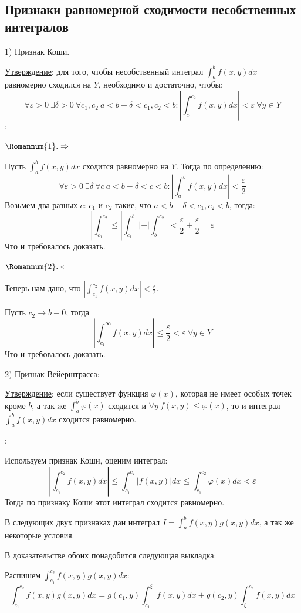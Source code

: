 \documentclass[12pt]{article}
\begin{document}
\subsection{Признаки равномерной сходимости несобственных интегралов}
1) Признак Коши.\par
\uline{Утверждение}: для того, чтобы несобственный интеграл $\int_a^b f(x,y) dx$ равномерно сходился на $Y$, необходимо и достаточно, чтобы:
$$\forall \varepsilon > 0 \ \exists \delta > 0 \ \forall c_1, c_2 \ a < b-\delta < c_1,c_2<b : |\int_{c_1}^{c_2} f(x,y) dx | < \varepsilon \ \forall y \in Y$$
:\par
$\Romannum{1}. \Rightarrow$\par
Пусть $\int_a^b f(x,y)dx$ сходится равномерно на $Y$. Тогда по определению:
$$\forall \varepsilon > 0 \ \exists \delta \ \forall c \ a < b -\delta < c < b : |\int_a^b f(x,y) dx| < \frac{\varepsilon}{2}$$
Возьмем два разных $c$: $c_1$ и $c_2$ такие, что $a < b-\delta < c_1,c_2 < b$, тогда:
$$|\int_{c_1}^{c_2} \leq |\int_{c_1}^b| + |\int_b^{c_2}| < \frac{\varepsilon}{2} + \frac{\varepsilon}{2} = \varepsilon$$
Что и требовалось доказать.\par
$\Romannum{2}. \Leftarrow$\par
Теперь нам дано, что $|\int_{c_1}^{c_2} f(x,y) dx| < \frac{\varepsilon}{2}$.\par
Пусть $c_2 \to b-0$, тогда
$$|\int_{c_1}^\infty f(x,y) dx | \leq \frac{\varepsilon}{2} < \varepsilon \ \forall y \in Y$$
Что и требовалось доказать.\par
2) Признак Вейерштрасса:\par
\uline{Утверждение}: если существует функция $\varphi(x)$, которая не имеет особых точек кроме $b$, а так же $\int_a^b \varphi(x)$ сходится и $\forall y \ f(x,y) \leq \varphi(x)$, то и интеграл $\int_a^b f(x,y) dx$ сходится равномерно.\par
{}:\par
Используем признак Коши, оценим интеграл:
$$|\int_{c_1}^{c_2} f(x,y) dx| \leq \int_{c_1}^{c_2} |f(x,y)| dx \leq \int_{c_1}^{c_2} \varphi(x) dx < \varepsilon$$
Тогда по признаку Коши этот интеграл сходится равномерно.\par
В следующих двух признаках дан интеграл $I = \int_a^b f(x,y) g(x,y) dx$, а так же некоторые условия.\par
В доказательстве обоих понадобится следующая выкладка:\par
Распишем $\int_{c_1}^{c_2} f(x,y) g(x,y) dx$:
$$\int_{c_1}^{c_2} f(x,y) g(x,y) dx = g(c_1,y) \int_{c_1}^{\xi} f(x,y) dx + g(c_2,y) \int_{\xi}^{c_2} f(x,y)dx$$
\end{document}
